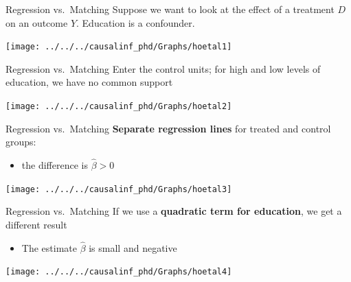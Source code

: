 \documentclass[
  ignorenonframetext,
  aspectratio=169, handout]{beamer}
\providecommand{\tightlist}{%
  \setlength{\itemsep}{0pt}\setlength{\parskip}{0pt}}
\newcommand{\brf}[1]{\textcolor{brickred}{\textbf{#1}}}
\begin{document}
\begin{frame}{Regression vs.~Matching}
\protect\hypertarget{regression-vs.-matching}{}
Suppose we want to look at the effect of a treatment \(D\) on an outcome
\(Y\). Education is a confounder.

\begin{center}\texttt{[image: ../../../causalinf\_phd/Graphs/hoetal1]} \end{center}
\end{frame}

\begin{frame}{Regression vs.~Matching}
\protect\hypertarget{regression-vs.-matching-1}{}
Enter the control units; for high and low levels of education, we have
no common support

\begin{center}\texttt{[image: ../../../causalinf\_phd/Graphs/hoetal2]} \end{center}
\end{frame}

\begin{frame}{Regression vs.~Matching}
\protect\hypertarget{regression-vs.-matching-2}{}
\brf{Separate regression lines} for treated and control groups:

\begin{itemize}
\tightlist
\item
  the difference is \(\widehat{\beta}>0\)
\end{itemize}

\begin{center}\texttt{[image: ../../../causalinf\_phd/Graphs/hoetal3]} \end{center}
\end{frame}

\begin{frame}{Regression vs.~Matching}
\protect\hypertarget{regression-vs.-matching-3}{}
If we use a \brf{quadratic term for education}, we get a different
result

\begin{itemize}
\tightlist
\item
  The estimate \(\widehat{\beta}\) is small and negative
\end{itemize}

\begin{center}\texttt{[image: ../../../causalinf\_phd/Graphs/hoetal4]} \end{center}
\end{frame}
\end{document}
